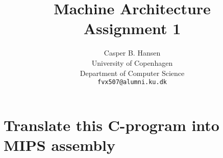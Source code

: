 \documentclass[11pt,a4paper]{article}
\title
{
	Machine Architecture\\
	\Large Assignment 1
}
\author
{
	Casper B. Hansen\\
	University of Copenhagen\\
	Department of Computer Science\\
	{\tt fvx507@alumni.ku.dk}
}
\begin{document}
\maketitle

\section*{Translate this C-program into MIPS assembly}

\lstset{language=[mips]Assembler}

\lstset{language=C}
\end{document}
